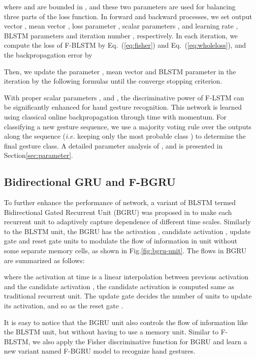 \documentclass[review]{elsarticle}
\begin{document}
where  and  are bounded in , and these two parameters are used for balancing three parts of the loss function. In forward and backward processes, we set output vector , mean vector , loss parameter , scalar parameters ,  and learning rate , BLSTM parameters  and iteration number , respectively. In each iteration, we compute the loss of F-BLSTM by Eq.~(\ref{eq:fisher}) and Eq.~(\ref{eq:wholeloss}), and the backpropagation error by

Then, we update the parameter , mean vector  and BLSTM parameter  in the  iteration by the following formulas until the converge stopping criterion.



With proper scalar parameters ,  and , the discriminative power of F-LSTM can be significantly enhanced for hand gesture recognition. This network is learned using classical online backpropagation through time with momentum. For classifying a new gesture sequence, we use a majority voting rule over the outputs along the sequence (\emph{i.e.} keeping only the most probable class ) to determine the final gesture class. A detailed parameter analysis of ,  and  is presented in Section\;\ref{sec:parameter}.

\subsection{Bidirectional GRU and F-BGRU}\label{sec:bgru}
To further enhance the performance of network, a variant of BLSTM termed Bidirectional Gated Recurrent Unit (BGRU) was proposed in\;\cite{cho2014arxiv,chung2014eprint} to make each recurrent unit to adaptively capture dependence of different time scales. Similarly to the BLSTM unit, the BGRU has the activation , candidate activation , update gate  and reset gate  units to modulate the flow of information in unit without some separate memory cells, as shown in Fig.\;\ref{fig:bgru-unit}. The flows in BGRU are summarized as follows:


where the activation  at time  is a linear interpolation between previous activation  and the candidate activation , the candidate activation  is computed same as traditional recurrent unit. The update gate  decides the number of units to update its activation, and so as the reset gate .

It is easy to notice that the BGRU unit also controls the flow of information like the BLSTM unit, but without having to use a memory unit. Similar to F-BLSTM, we also apply the Fisher discriminative function for BGRU and learn a new variant named F-BGRU model to recognize hand gestures.
\end{document}
